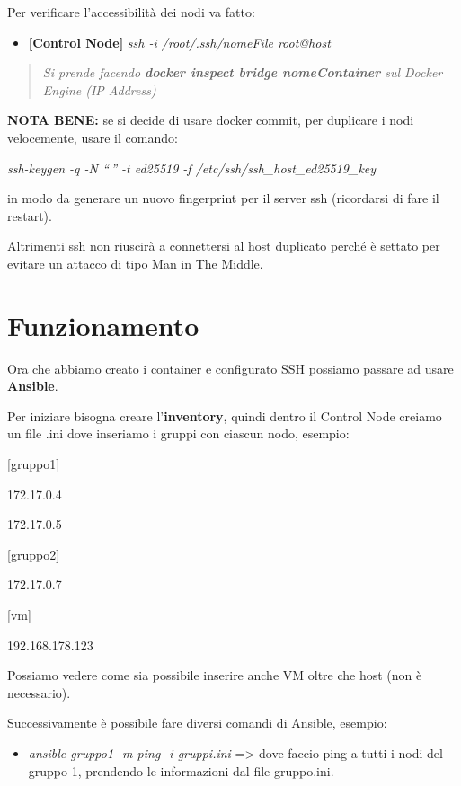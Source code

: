 Per verificare l'accessibilità dei nodi va fatto:

\begin{itemize}
\item
  \textbf{{[}Control Node{]}} \emph{ssh -i /root/.ssh/nomeFile
  root@host}
\end{itemize}

\begin{quote}
\emph{Si prende facendo \textbf{docker inspect bridge nomeContainer} sul
Docker Engine (IP Address)}
\end{quote}

\textbf{NOTA BENE:} se si decide di usare docker commit, per duplicare i
nodi velocemente, usare il comando:

\emph{ssh-keygen -q -N ``\,'' -t ed25519 -f
/etc/ssh/ssh\_host\_ed25519\_key}

in modo da generare un nuovo fingerprint per il server ssh (ricordarsi
di fare il restart).

Altrimenti ssh non riuscirà a connettersi al host duplicato perché è
settato per evitare un attacco di tipo Man in The Middle.

\section{Funzionamento}\label{funzionamento}

Ora che abbiamo creato i container e configurato SSH possiamo passare ad
usare \textbf{Ansible}.

Per iniziare bisogna creare l'\textbf{inventory}, quindi dentro il
Control Node creiamo un file .ini dove inseriamo i gruppi con ciascun
nodo, esempio:

{[}gruppo1{]}

172.17.0.4

172.17.0.5

{[}gruppo2{]}

172.17.0.7

{[}vm{]}

192.168.178.123

Possiamo vedere come sia possibile inserire anche VM oltre che host (non
è necessario).

Successivamente è possibile fare diversi comandi di Ansible, esempio:

\begin{itemize}
\item
  \emph{ansible gruppo1 -m ping -i gruppi.ini} =\textgreater{} dove
  faccio ping a tutti i nodi del gruppo 1, prendendo le informazioni dal
  file gruppo.ini.
\end{itemize}

